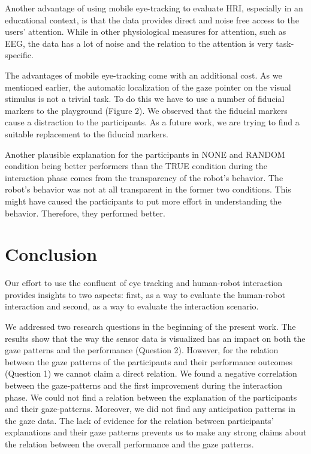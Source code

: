 \documentclass{sig-alternate}
\begin{document}
Another advantage of using mobile eye-tracking to evaluate HRI,
especially in an educational context, is that the data provides direct
and noise free access to the users' attention. While in other
physiological measures for attention, such as EEG, the data has a lot of
noise and the relation to the attention is very task-specific.

The advantages of mobile eye-tracking come with an additional cost. As
we mentioned earlier, the automatic localization of the gaze pointer on
the visual stimulus is not a trivial task. To do this we have to use a
number of fiducial markers to the playground (Figure 2). We observed
that the fiducial markers cause a distraction to the participants. As a
future work, we are trying to find a suitable replacement to the
fiducial markers.

Another plausible explanation for the participants in {\sf NONE} and {\sf RANDOM} condition
being better performers than the {\sf TRUE} condition during the interaction phase
comes from the transparency of the robot's behavior. The robot's
behavior was not at all transparent in the former two conditions. This might
have caused the participants to put more effort in understanding the behavior.
Therefore, they performed better.


\section{Conclusion}

Our effort to use the confluent of eye tracking and human-robot
interaction provides insights to two aspects: first, as a way to
evaluate the human-robot interaction and second, as a way to evaluate
the interaction scenario.

We addressed two research questions in the beginning of the present
work. The results show that the way the sensor data is visualized has an
impact on both the gaze patterns and the performance (Question 2).
However, for the relation between the gaze patterns of the participants
and their performance outcomes (Question 1) we cannot claim a direct
relation. We found a negative correlation between the gaze-patterns and
the first improvement during the interaction phase. We could not find a
relation between the explanation of the participants and their
gaze-patterns. Moreover, we did not find any anticipation patterns in
the gaze data. The lack of evidence for the relation between
participants' explanations and their gaze patterns prevents us to make
any strong claims about the relation between the overall performance and
the gaze patterns.
\end{document}
